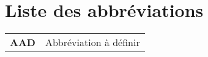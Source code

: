 \chapter{Liste des abbréviations}

\begin{table}[ht]
	\begin{tabular}{ll}
		\textbf{AAD} & Abbréviation à définir
	\end{tabular}
\end{table}


\clearpage
\thispagestyle{empty}